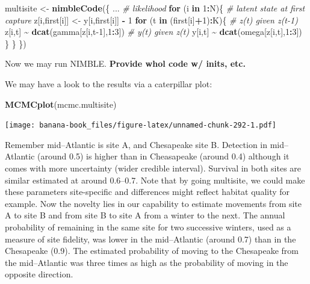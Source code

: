 \documentclass[
  12pt,
]{krantz}
\newenvironment{Shaded}{\begin{snugshade}}{\end{snugshade}}
\newcommand{\CommentTok}[1]{\textcolor[rgb]{0.56,0.35,0.01}{\textit{#1}}}
\newcommand{\ControlFlowTok}[1]{\textcolor[rgb]{0.13,0.29,0.53}{\textbf{#1}}}
\newcommand{\DecValTok}[1]{\textcolor[rgb]{0.00,0.00,0.81}{#1}}
\newcommand{\FunctionTok}[1]{\textcolor[rgb]{0.13,0.29,0.53}{\textbf{#1}}}
\newcommand{\NormalTok}[1]{#1}
\newcommand{\OtherTok}[1]{\textcolor[rgb]{0.56,0.35,0.01}{#1}}
\newcommand{\SpecialCharTok}[1]{\textcolor[rgb]{0.81,0.36,0.00}{\textbf{#1}}}
\begin{document}
\begin{Shaded}
\begin{Highlighting}[]
\NormalTok{multisite }\OtherTok{\textless{}{-}} \FunctionTok{nimbleCode}\NormalTok{(\{}
\NormalTok{...}
  \CommentTok{\# likelihood}
  \ControlFlowTok{for}\NormalTok{ (i }\ControlFlowTok{in} \DecValTok{1}\SpecialCharTok{:}\NormalTok{N)\{}
    \CommentTok{\# latent state at first capture}
\NormalTok{    z[i,first[i]] }\OtherTok{\textless{}{-}}\NormalTok{ y[i,first[i]] }\SpecialCharTok{{-}} \DecValTok{1}
    \ControlFlowTok{for}\NormalTok{ (t }\ControlFlowTok{in}\NormalTok{ (first[i]}\SpecialCharTok{+}\DecValTok{1}\NormalTok{)}\SpecialCharTok{:}\NormalTok{K)\{}
      \CommentTok{\# z(t) given z(t{-}1)}
\NormalTok{      z[i,t] }\SpecialCharTok{\textasciitilde{}} \FunctionTok{dcat}\NormalTok{(gamma[z[i,t}\DecValTok{{-}1}\NormalTok{],}\DecValTok{1}\SpecialCharTok{:}\DecValTok{3}\NormalTok{])}
      \CommentTok{\# y(t) given z(t)}
\NormalTok{      y[i,t] }\SpecialCharTok{\textasciitilde{}} \FunctionTok{dcat}\NormalTok{(omega[z[i,t],}\DecValTok{1}\SpecialCharTok{:}\DecValTok{3}\NormalTok{])}
\NormalTok{    \}}
\NormalTok{  \}}
\NormalTok{\})}
\end{Highlighting}
\end{Shaded}

Now we may run NIMBLE. \textbf{Provide whol code w/ inits, etc.}

We may have a look to the results via a caterpillar plot:

\begin{Shaded}
\begin{Highlighting}[]
\FunctionTok{MCMCplot}\NormalTok{(mcmc.multisite)}
\end{Highlighting}
\end{Shaded}

\texttt{[image: banana-book\_files/figure-latex/unnamed-chunk-292-1.pdf]}

Remember mid--Atlantic is site A, and Chesapeake site B. Detection in mid--Atlantic (around 0.5) is higher than in Cheasapeake (around 0.4) although it comes with more uncertainty (wider credible interval). Survival in both sites are similar estimated at around 0.6--0.7. Note that by going multisite, we could make these parameters site-specific and differences might reflect habitat quality for example. Now the novelty lies in our capability to estimate movements from site A to site B and from site B to site A from a winter to the next. The annual probability of remaining in the same site for two successive
winters, used as a measure of site fidelity, was lower in the mid--Atlantic (around 0.7) than in the Chesapeake (0.9). The estimated probability of moving to the Chesapeake from the mid--Atlantic was three times as high as the probability of moving in the opposite direction.
\end{document}
